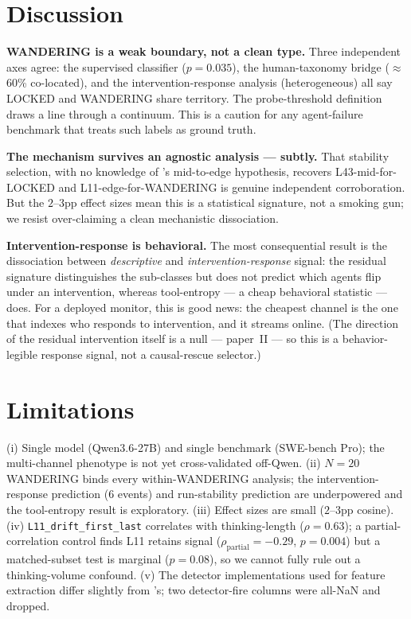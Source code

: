 \documentclass[11pt]{article}
\begin{document}
\section{Discussion}

\textbf{WANDERING is a weak boundary, not a clean type.} Three independent axes agree: the supervised classifier ($p{=}0.035$), the human-taxonomy bridge ($\approx$60\% co-located), and the intervention-response analysis (heterogeneous) all say LOCKED and WANDERING share territory. The probe-threshold definition draws a line through a continuum. This is a caution for any agent-failure benchmark that treats such labels as ground truth.

\textbf{The mechanism survives an agnostic analysis --- subtly.} That stability selection, with no knowledge of \cite{toolentropy2026}'s mid-to-edge hypothesis, recovers L43-mid-for-LOCKED and L11-edge-for-WANDERING is genuine independent corroboration. But the $2$--$3$pp effect sizes mean this is a statistical signature, not a smoking gun; we resist over-claiming a clean mechanistic dissociation.

\textbf{Intervention-response is behavioral.} The most consequential result is the dissociation between \emph{descriptive} and \emph{intervention-response} signal: the residual signature distinguishes the sub-classes but does not predict which agents flip under an intervention, whereas tool-entropy --- a cheap behavioral statistic --- does. For a deployed monitor, this is good news: the cheapest channel is the one that indexes who responds to intervention, and it streams online. (The direction of the residual intervention itself is a null --- paper~II --- so this is a behavior-legible response signal, not a causal-rescue selector.)

\section{Limitations}

(i) Single model (Qwen3.6-27B) and single benchmark (SWE-bench Pro); the multi-channel phenotype is not yet cross-validated off-Qwen. (ii) $N{=}20$ WANDERING binds every within-WANDERING analysis; the intervention-response prediction ($6$ events) and run-stability prediction are underpowered and the tool-entropy result is exploratory. (iii) Effect sizes are small ($2$--$3$pp cosine). (iv) \texttt{L11\_drift\_first\_last} correlates with thinking-length ($\rho{=}0.63$); a partial-correlation control finds L11 retains signal ($\rho_{\text{partial}}{=}-0.29$, $p{=}0.004$) but a matched-subset test is marginal ($p{=}0.08$), so we cannot fully rule out a thinking-volume confound. (v) The detector implementations used for feature extraction differ slightly from \cite{toolentropy2026}'s; two detector-fire columns were all-NaN and dropped.
\end{document}
